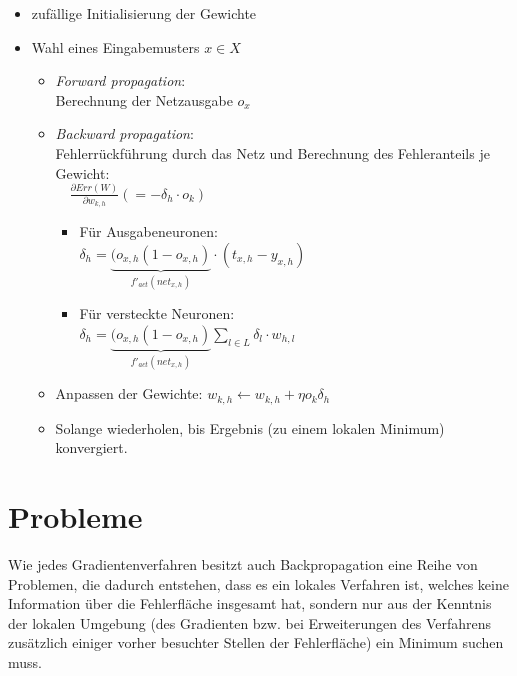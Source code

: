 \begin{itemize}
	\item zufällige Initialisierung der Gewichte
	\item Wahl eines Eingabemusters $x \in X$

	\begin{itemize}
		\item \emph{Forward propagation}: \\
			Berechnung der Netzausgabe $o_x$
		\item \emph{Backward propagation}: \\
			Fehlerrückführung durch das Netz und Berechnung des Fehleranteils je Gewicht: \\
			$\quad \frac{\partial Err(W)}{\partial w_{k,h}}
				(= - \delta_h \cdot o_k) $

		\begin{itemize}
			\item Für Ausgabeneuronen: \\
				$\delta_h = 
				\underbrace{(o_{x,h}(1-o_{x,h})}_{f'_{act}(net_{x,h})} 
				\cdot (t_{x,h}-y_{x,h})$ 
			\item Für versteckte Neuronen: \\
				$\delta_h = 
				\underbrace{(o_{x,h}(1-o_{x,h})}_{f'_{act}(net_{x,h})} 
				\sum_{l \in L} \delta_l \cdot w_{h,l}$ 
		\end{itemize}

		\item Anpassen der Gewichte: $w_{k,h} \leftarrow w_{k,h} + \eta o_k \delta_h$ 
		\item Solange wiederholen, bis Ergebnis (zu einem lokalen Minimum) konvergiert.
	\end{itemize}

\end{itemize}


\section*{Probleme}
Wie jedes Gradientenverfahren besitzt auch Backpropagation eine Reihe von Problemen, die dadurch entstehen, dass es ein lokales Verfahren ist, welches keine Information über die Fehlerfläche insgesamt hat, sondern nur aus der Kenntnis der lokalen Umgebung (des Gradienten bzw. bei Erweiterungen des Verfahrens zusätzlich einiger vorher besuchter Stellen der Fehlerfläche) ein Minimum suchen muss.

